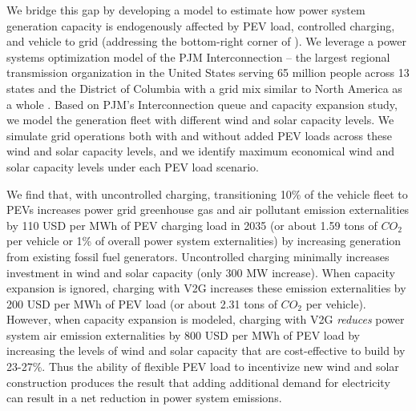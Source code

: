 \documentclass[9pt,twocolumn,twoside,lineno]{pnas-new}
\begin{document}


We bridge this gap by developing a model to estimate how power system generation capacity is endogenously affected by PEV load, controlled charging, and vehicle to grid (addressing the bottom-right corner of ). We leverage a power systems optimization model of the PJM Interconnection -- the largest regional transmission organization in the United States serving 65 million people across 13 states and the District of Columbia with a grid mix similar to North America as a whole \cite{lueken_effects_2014,weis_emissions_2015,weis_consequential_2016,bruchon_cleaning_2024}. Based on PJM's Interconnection queue and capacity expansion study, we model the generation fleet with different wind and solar capacity levels. We simulate grid operations both with and without added PEV loads across these wind and solar capacity levels, and we identify maximum economical wind and solar capacity levels under each PEV load scenario. 

We find that, with uncontrolled charging, transitioning 10\% of the vehicle fleet to PEVs increases power grid greenhouse gas and air pollutant emission externalities by 110 USD per MWh of PEV charging load in 2035 (or about 1.59 tons of $CO_2$ per vehicle or 1\% of overall power system externalities) by increasing generation from existing fossil fuel generators. Uncontrolled charging minimally increases investment in wind and solar capacity (only 300 MW increase). When capacity expansion is ignored, charging with V2G increases these emission externalities by 200 USD per MWh of PEV load (or about 2.31 tons of $CO_2$ per vehicle). However, when capacity expansion is modeled, charging with V2G \textit{reduces} power system air emission externalities by 800 USD per MWh of PEV load by increasing the levels of wind and solar capacity that are cost-effective to build by 23-27\%. Thus the ability of flexible PEV load to incentivize new wind and solar construction produces the result that adding additional demand for electricity can result in a net reduction in power system emissions. 

\end{document}
